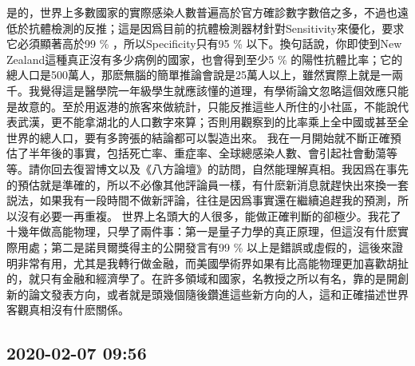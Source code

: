 \documentclass[twocolumn]{ctexart}
\begin{document}
是的，世界上多數國家的實際感染人數普遍高於官方確診數字數倍之多，不過也遠低於抗體檢測的反推；這是因爲目前的抗體檢測器材針對Sensitivity來優化，要求它必須顯著高於99 \% ，所以Specificity只有95 \% 以下。換句話說，你即使到New Zealand這種真正沒有多少病例的國家，也會得到至少5 \% 的陽性抗體比率；它的總人口是500萬人，那麽無腦的簡單推論會說是25萬人以上，雖然實際上就是一兩千。我覺得這是醫學院一年級學生就應該懂的道理，有學術論文忽略這個效應只能是故意的。至於用返港的旅客來做統計，只能反推這些人所住的小社區，不能說代表武漢，更不能拿湖北的人口數字來算；否則用觀察到的比率乘上全中國或甚至全世界的總人口，要有多誇張的結論都可以製造出來。
我在一月開始就不斷正確預估了半年後的事實，包括死亡率、重症率、全球總感染人數、會引起社會動蕩等等。請你回去復習博文以及《八方論壇》的訪問，自然能理解真相。我因爲在事先的預估就是準確的，所以不必像其他評論員一樣，有什麽新消息就趕快出來換一套説法，如果我有一段時間不做新評論，往往是因爲事實還在繼續追趕我的預測，所以沒有必要一再重複。
世界上名頭大的人很多，能做正確判斷的卻極少。我花了十幾年做高能物理，只學了兩件事：第一是量子力學的真正原理，但這沒有什麽實際用處；第二是諾貝爾獎得主的公開發言有99 \% 以上是錯誤或虛假的，這後來證明非常有用，尤其是我轉行做金融，而美國學術界如果有比高能物理更加喜歡胡扯的，就只有金融和經濟學了。在許多領域和國家，名教授之所以有名，靠的是開創新的論文發表方向，或者就是頭幾個隨後鑽進這些新方向的人，這和正確描述世界客觀真相沒有什麽關係。
\subsection*{2020-02-07 09:56}
\end{document}
